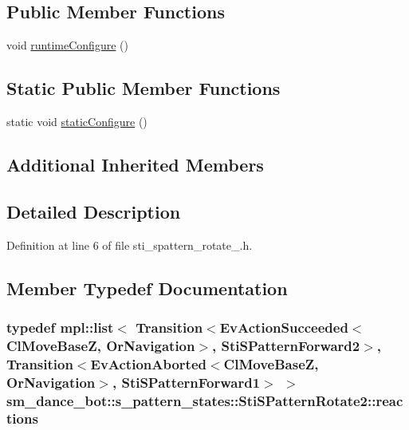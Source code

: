 \subsection*{Public Member Functions}
\begin{DoxyCompactItemize}
\item 
void \hyperlink{structsm__dance__bot_1_1s__pattern__states_1_1StiSPatternRotate2_a26cebb32aecbbbfe02fe9c56947d24a7}{runtime\+Configure} ()
\end{DoxyCompactItemize}
\subsection*{Static Public Member Functions}
\begin{DoxyCompactItemize}
\item 
static void \hyperlink{structsm__dance__bot_1_1s__pattern__states_1_1StiSPatternRotate2_a9f103a22535857ca48e494824c194244}{static\+Configure} ()
\end{DoxyCompactItemize}
\subsection*{Additional Inherited Members}


\subsection{Detailed Description}


Definition at line 6 of file sti\+\_\+spattern\+\_\+rotate\+\_.\+h.



\subsection{Member Typedef Documentation}
\subsubsection[{\texorpdfstring{reactions}{reactions}}]{\setlength{\rightskip}{0pt plus 5cm}typedef mpl\+::list$<$ Transition$<${\bf Ev\+Action\+Succeeded}$<${\bf Cl\+Move\+BaseZ}, {\bf Or\+Navigation}$>$, {\bf Sti\+S\+Pattern\+Forward2}$>$, Transition$<${\bf Ev\+Action\+Aborted}$<${\bf Cl\+Move\+BaseZ}, {\bf Or\+Navigation}$>$, {\bf Sti\+S\+Pattern\+Forward1}$>$ $>$ {\bf sm\+\_\+dance\+\_\+bot\+::s\+\_\+pattern\+\_\+states\+::\+Sti\+S\+Pattern\+Rotate2\+::reactions}}\hypertarget{structsm__dance__bot_1_1s__pattern__states_1_1StiSPatternRotate2_a8408b6f8b356b536b1ebe328ba6f7b02}{}\label{structsm__dance__bot_1_1s__pattern__states_1_1StiSPatternRotate2_a8408b6f8b356b536b1ebe328ba6f7b02}


